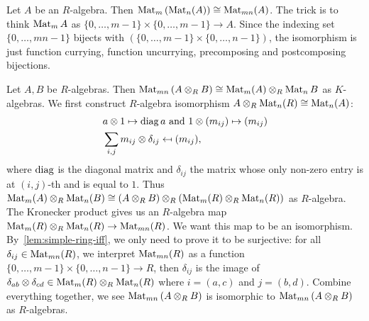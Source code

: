 \begin{construction}
  \label{con:matrix-matrix}
  Let $A$ be an $R$-algebra. Then $\operatorname{Mat}_{m}\left(\operatorname{Mat}_{n}(A)\right) \cong \operatorname{Mat}_{mn}(A)$.
  The trick is to think $\operatorname{Mat}_{m}A$ as $\{0,\dots,m-1\} \times \{0,\dots,m-1\} \to A$. Since the indexing set $\{0,\dots,mn-1\}$ bijects with $\left(\{0,\dots,m-1\}\times\{0,\dots,n-1\}\right)$, the isomorphism is just function currying, function uncurrying, precomposing and postcomposing bijections.
  \leanok
\end{construction}

\begin{construction}
  \label{con:matrix-tensor-matrix}
  Let $A, B$ be $R$-algebras. Then $\operatorname{Mat}_{mn}\left(A\otimes_{R}B\right)\cong\operatorname{Mat}_{m}(A)\otimes_{R}\operatorname{Mat}_{n}B$ as $K$-algebras. We first construct $R$-algebra isomorphism $A \otimes_{R}\operatorname{Mat}_{n}(R) \cong \operatorname{Mat}_{n}(A)$:
  \[
    \begin{aligned}
      & a \otimes 1 \mapsto \operatorname{diag}{a}~\text{and}~ 1\otimes (m_{ij}) \mapsto (m_{ij})\\
      & \sum_{i,j} m_{ij}\otimes \delta_{ij}\mapsfrom (m_{ij}),
    \end{aligned}
  \]
  where $\operatorname{diag}$ is the diagonal matrix and $\delta_{ij}$ the matrix whose only non-zero entry is at $(i,j)$-th and is equal to $1$.
  Thus $\operatorname{Mat}_{m}(A)\otimes_{R}\operatorname{Mat}_{n}(B)\cong \left(A\otimes_{R}B\right)\otimes_{R} \left(\operatorname{Mat}_{m}(R)\otimes_{R} \operatorname{Mat}_{n}(R)\right)$ as $R$-algebra.
  The Kronecker product gives us an $R$-algebra map $\operatorname{Mat}_{m}(R)\otimes_{R}\operatorname{Mat}_{n}(R) \to \operatorname{Mat}_{mn}(R)$. We want this map to be an isomorphism. By~\cref{lem:simple-ring-iff}, we only need to prove it to be surjective: for all $\delta_{ij} \in \operatorname{Mat}_{mn}(R)$, we interpret $\operatorname{Mat}_{mn}(R)$ as a function $\{0,\dots,m-1\}\times\{0,\dots,n-1\}\to R$, then $\delta_{ij}$ is the image of $\delta_{ab}\otimes \delta_{cd} \in \operatorname{Mat}_{m}(R)\otimes_{R}\operatorname{Mat}_{n}(R)$ where $i = (a, c)$ and $j = (b,d)$. Combine everything together, we see $\operatorname{Mat}_{mn}\left(A\otimes_{R}B\right)$ is isomorphic to $\operatorname{Mat}_{mn}\left(A\otimes_{R} B\right)$ as $R$-algebras.
  \leanok
\end{construction}

